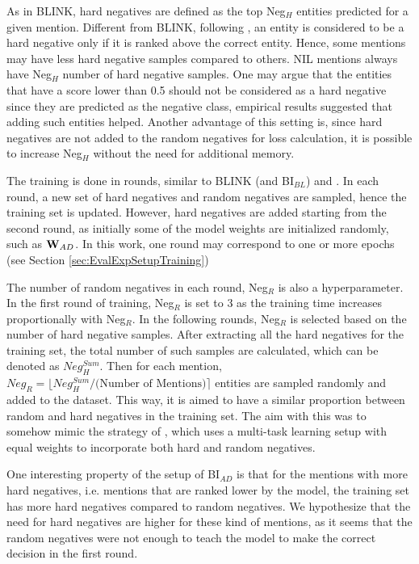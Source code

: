 \documentclass{report}
\theoremstyle{definition}
\theoremstyle{remark}
\begin{document}
As in BLINK, hard negatives are defined as the top Neg$_{H}$ entities predicted for a given mention. Different from BLINK, following \cite{googleintern}, an entity is considered to be a hard negative only if it is ranked above the correct entity. Hence, some mentions may have less hard negative samples compared to others. NIL mentions always have Neg$_{H}$ number of hard negative samples. One may argue that the entities that have a score lower than 0.5 should not be considered as a hard negative since they are predicted as the negative class, empirical results suggested that adding such entities helped. Another advantage of this setting is, since hard negatives are not added to the random negatives for loss calculation, it is possible to increase Neg$_{H}$ without the need for additional memory.

The training is done in rounds, similar to BLINK (and BI$_{BL}$) and \cite{googleintern}. In each round, a new set of hard negatives and random negatives are sampled, hence the training set is updated. However, hard negatives are added starting from the second round, as initially some of the model weights are initialized randomly, such as $\bold{W}_{AD}$. In this work, one round may correspond to one or more epochs (see Section \ref{sec:EvalExpSetupTraining})

The number of random negatives in each round, Neg$_R$ is also a hyperparameter. In the first round of training, Neg$_R$ is set to 3 as the training time increases proportionally with Neg$_R$. In the following rounds, Neg$_R$ is selected based on the number of hard negative samples. After extracting all the hard negatives for the training set, the total number of such samples are calculated, which can be denoted as $Neg_{H}^{Sum}$. Then for each mention, $Neg_R = \lfloor Neg_{H}^{Sum}/ \text{(Number of Mentions)} \rceil$ entities are sampled randomly and added to the dataset. This way, it is aimed to have a similar proportion between random and hard negatives in the training set. The aim with this was to somehow mimic the strategy of \cite{googleintern}, which uses a multi-task learning setup with equal weights to incorporate both hard and random negatives. 

One interesting property of the setup of BI$_{AD}$ is that for the mentions with more hard negatives, i.e. mentions that are ranked lower by the model, the training set has more hard negatives compared to random negatives. We hypothesize that the need for hard negatives are higher for these kind of mentions, as it seems that the random negatives were not enough to teach the model to make the correct decision in the first round.
\end{document}
